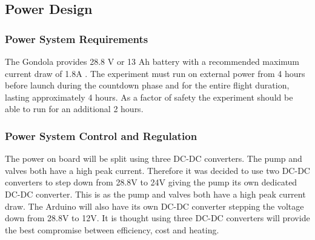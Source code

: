 \pagebreak
\subsection{Power Design}

\subsubsection{Power System Requirements}
\begin{centering}
The Gondola provides 28.8 V or 13 Ah battery with a recommended maximum current draw of 1.8A \cite{BexusManual}. The experiment must run on external power from 4 hours before launch during the countdown phase and for the entire flight duration, lasting approximately 4 hours. As a factor of safety the experiment should be able to run for an additional 2 hours. 
\end{centering}



\subsubsection{Power System Control and Regulation}
The power on board will be split using three DC-DC converters. The pump and valves both have a high peak current. Therefore it was decided to use two DC-DC converters to step down from 28.8V to 24V giving the pump its own dedicated DC-DC converter. This is as the pump and valves both have a high peak current draw. The Arduino will also have its own DC-DC converter stepping the voltage down from 28.8V to 12V. It is thought using three DC-DC converters will provide the best compromise between efficiency, cost and heating.

\raggedbottom
